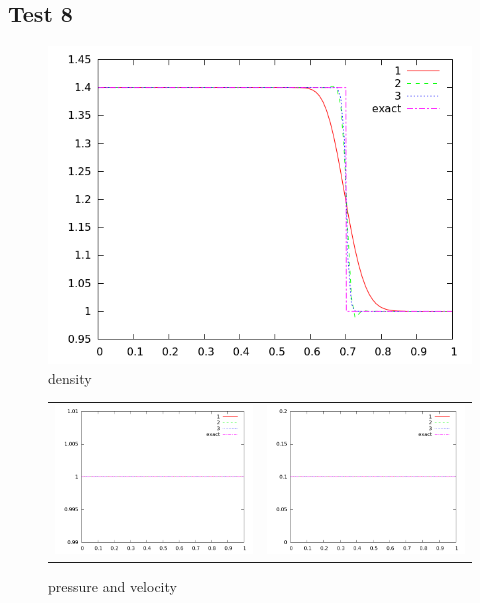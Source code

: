 \documentclass[10pt,preprint]{aastex}
\begin{document}
\clearpage

\subsection{Test 8}

\begin{figure}[h]
  \begin{center}
     \includegraphics[width=.78\textwidth]{den_T8.png}	
  \end{center}
  \caption{density}
\end{figure}

\begin{figure}
  \begin{center}
	\begin{tabular}{cc}
      \includegraphics[width=.425\textwidth]{prs_T8.png} &
	  \includegraphics[width=.425\textwidth]{vel_T8.png}
	\end{tabular}
  \end{center}
  \caption{pressure and velocity}
\end{figure}
\end{document}
